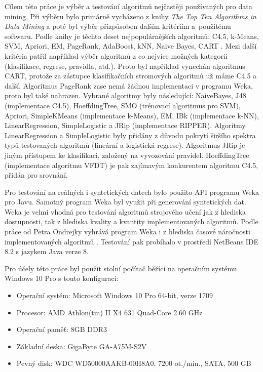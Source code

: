 \documentclass[12pt]{article}
\begin{document}

Cílem této práce je výběr a testování algoritmů nejčastěji používaných pro data mining. Při výběru bylo primárně vycházeno z knihy \textit{The Top Ten Algorithms in Data Mining} a poté byl výběr přizpůsoben dalším kritériím a~použitému softwaru. Podle knihy  je těchto deset nejpopulárnějších algoritmů: C4.5, k-Means, SVM,
Apriori, EM, PageRank, AdaBoost, kNN, Naive Bayes, CART \citep{top10}. Mezi další kritéria patřil například  výběr algoritmů z co nejvíce možných kategorií (klasifikace, regrese, pravidla, atd.). Proto byl například vynechán algoritmus CART, protože za zástupce klasifikačních stromových algoritmů už máme C4.5 a další. Algoritmus PageRank zase nemá žádnou implementaci v programu Weka, proto byl také nahrazen. 
\newline
\indent
Vybrané algoritmy byly následující: NaiveBayes, J48 (implementace C4.5), HoeffdingTree, SMO (trénovací algoritmus pro SVM), Apriori, SimpleKMeans (implementace k-Means), EM, IBk (implementace k-NN), LinearRegression, SimpleLogistic a JRip (implementace RIPPER). Algoritmy LinearRegression a SimpleLogistic byly přidány z důvodu pokrytí širšího spektra typů testovaných algoritmů (lineární a logistická regrese). Algoritmus JRip je jiným přístupem ke klasifikaci, založený na vyvozování pravidel. HoeffdingTree (implementace algoritmu VFDT) je pak zajímavým konkurentem algoritmu C4.5, přidán pro srovnání.  

Pro testování na reálných i syntetických datech bylo použito API programu Weka pro Javu. Samotný program Weka byl využit při generování syntetických dat. Weka je velmi vhodná pro testování algoritmů strojového učení jak z hlediska dostupnosti, tak z hlediska kvality a kvantity implementovaných algoritmů. Podle práce  od Petra Ondrejky vyhrává program Weka i z hlediska časové náročnosti implementovaných algoritmů \citep{ondrejka}. Testování pak probíhalo v prostředí NetBeans IDE 8.2 s jazykem Java verze 8.

Pro účely této práce byl použit stolní počítač běžící na operačním systému Windows 10 Pro s touto konfigurací:
\begin{itemize}
\item Operační systém: Microsoft Windows 10 Pro 64-bit, verze 1709
\item Procesor: AMD Athlon(tm) II X4 631 Quad-Core 2.60 GHz
\item Operační paměť: 8GB DDR3
\item Základní deska: GigaByte GA-A75M-S2V
\item Pevný disk: WDC WD50000AAKB-00H8A0, 7200 ot./min., SATA, 500 GB
\end{itemize}
\end{document}
